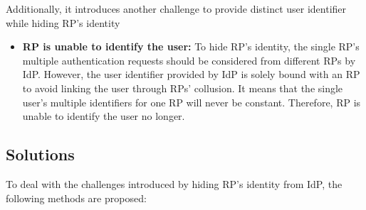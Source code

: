 Additionally, it introduces another challenge to provide distinct user identifier while hiding RP's identity
\begin{itemize}
\item \textbf{RP is unable to identify the user: }To hide RP's identity, the single RP's multiple authentication requests should be considered from different RPs by IdP. However, the user identifier provided by IdP is solely bound with an RP to avoid linking the user through RPs' collusion. It means that the single user's multiple identifiers for one RP will never be constant. Therefore, RP is unable to identify the user no longer.
\end{itemize}

\subsection{Solutions}
To deal with the challenges introduced by hiding RP's identity from IdP, the following methods are proposed:
